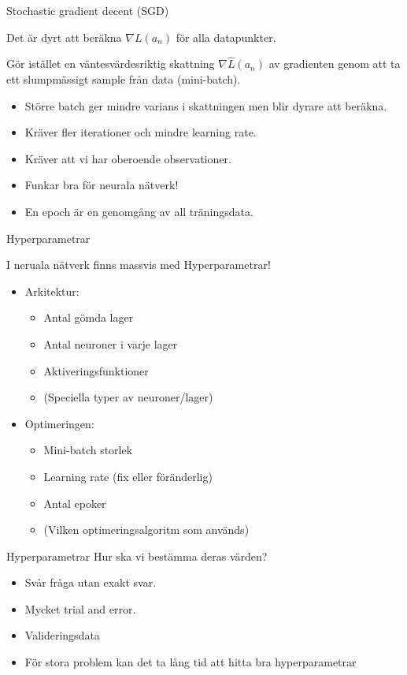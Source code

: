 \documentclass[10pt,english]{beamer}
\begin{document}
\begin{frame}{Stochastic gradient decent (SGD)}

    Det är dyrt att beräkna $\nabla L(a_n)$ för alla datapunkter.

    Gör istället en väntesvärdesriktig skattning $\nabla \hat{L}(a_n)$ av gradienten genom att ta ett slumpmässigt sample från data (mini-batch).

    \begin{itemize}
        \item Större batch ger mindre varians i skattningen men blir dyrare att beräkna.
        \item Kräver fler iterationer och mindre learning rate.
        \item Kräver att vi har oberoende observationer.
        \item Funkar bra för neurala nätverk!
        \item En epoch är en genomgång av all träningsdata.
    \end{itemize}
    
\end{frame}

\begin{frame}{Hyperparametrar}
    
    I neruala nätverk finns massvis med Hyperparametrar!
    \begin{itemize}
        \item Arkitektur:
        \begin{itemize}
            \item Antal gömda lager
            \item Antal neuroner i varje lager
            \item Aktiveringsfunktioner
            \item (Speciella typer av neuroner/lager)
        \end{itemize}
        \item Optimeringen:
        \begin{itemize}
            \item Mini-batch storlek
            \item Learning rate (fix eller föränderlig)
            \item Antal epoker
            \item (Vilken optimeringsalgoritm som används)
        \end{itemize}
    \end{itemize}

\end{frame}

\begin{frame}{Hyperparametrar}
    Hur ska vi bestämma deras värden?
    \begin{itemize}
        \item Svår fråga utan exakt svar.
        \item Mycket trial and error.
        \item Valideringsdata
        \item För stora problem kan det ta lång tid att hitta bra hyperparametrar
    \end{itemize}
\end{frame}
\end{document}
